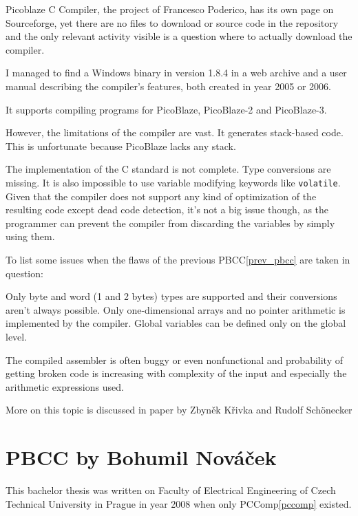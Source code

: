     Picoblaze C Compiler, the project of Francesco Poderico, has its own page on Sourceforge, %
    yet there are no files to download or source code in the repository and the only relevant activity visible is a question where to actually download the compiler.

    I managed to find a Windows binary in version 1.8.4 in a web archive and a user manual describing the compiler's features, both created in year 2005 or 2006.

    It supports compiling programs for PicoBlaze, PicoBlaze-2 and PicoBlaze-3.

    However, the limitations of the compiler are vast. It generates stack-based code. This is unfortunate because PicoBlaze lacks any stack. 

    The implementation of the C standard is not complete. Type conversions are missing. It is also impossible to use variable modifying keywords like \texttt{volatile}. Given that the compiler does not support any kind of optimization of the resulting code except dead code detection, it's not a big issue though, as the programmer can prevent the compiler from discarding the variables by simply using them.

    To list some issues when the flaws of the previous PBCC\ref{prev_pbcc} are taken in question:

    Only byte and word (1 and 2 bytes) types are supported and their conversions aren't always possible. Only one-dimensional arrays and no pointer arithmetic is implemented by the compiler.
    Global variables can be defined only on the global level. %

    The compiled assembler is often buggy or even nonfunctional and probability of getting broken code is increasing with complexity of the input and especially the arithmetic expressions used.

    More on this topic is discussed in paper by Zbyněk Křivka and Rudolf Schönecker %


    \section{PBCC by Bohumil Nováček}\label{not_quite_c}

    This bachelor thesis was written on Faculty of Electrical Engineering of Czech Technical University in Prague in year 2008 when only PCComp\ref{pccomp} existed.

